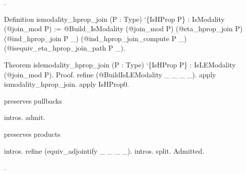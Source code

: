 \begin{coqdoccode}
.\coqdoceol
\coqdocemptyline
\coqdocnoindent
\begin{coqdoccomment}
\coqdoceol
Definition\coqdocindent{0.50em}
ismodality\_hprop\_join\coqdocindent{0.50em}
(P\coqdocindent{0.50em}
:\coqdocindent{0.50em}
Type)\coqdocindent{0.50em}
`\{IsHProp\coqdocindent{0.50em}
P\}\coqdoceol
\coqdocindent{1.00em}
:\coqdocindent{0.50em}
IsModality\coqdocindent{0.50em}
(@join\_mod\coqdocindent{0.50em}
P)\coqdoceol
\coqdocindent{1.00em}
:=\coqdocindent{0.50em}
@Build\_IsModality\coqdocindent{0.50em}
(@join\_mod\coqdocindent{0.50em}
P)\coqdoceol
\coqdocindent{11.50em}
(@eta\_hprop\_join\coqdocindent{0.50em}
P)\coqdoceol
\coqdocindent{11.50em}
(@ind\_hprop\_join\coqdocindent{0.50em}
P\coqdocindent{0.50em}
\_)\coqdoceol
\coqdocindent{11.50em}
(@ind\_hprop\_join\_compute\coqdocindent{0.50em}
P\coqdocindent{0.50em}
\_)\coqdoceol
\coqdocindent{11.50em}
(@isequiv\_eta\_hprop\_join\_path\coqdocindent{0.50em}
P\coqdocindent{0.50em}
\_).\coqdoceol
\coqdoceol
\end{coqdoccomment}
\coqdoceol
\coqdocemptyline
\coqdocnoindent
\begin{coqdoccomment}
\coqdoceol
Theorem\coqdocindent{0.50em}
islemodality\_hprop\_join\coqdocindent{0.50em}
(P\coqdocindent{0.50em}
:\coqdocindent{0.50em}
Type)\coqdocindent{0.50em}
`\{IsHProp\coqdocindent{0.50em}
P\}\coqdocindent{0.50em}
:\coqdoceol
\coqdocindent{1.00em}
IsLEModality\coqdocindent{0.50em}
(@join\_mod\coqdocindent{0.50em}
P).\coqdoceol
Proof.\coqdoceol
\coqdocindent{1.00em}
refine\coqdocindent{0.50em}
(@BuildIsLEModality\coqdocindent{0.50em}
\_\coqdocindent{0.50em}
\_\coqdocindent{0.50em}
\_\coqdocindent{0.50em}
\_).\coqdoceol
\coqdocindent{1.00em}
apply\coqdocindent{0.50em}
ismodality\_hprop\_join.\coqdocindent{0.50em}
apply\coqdocindent{0.50em}
IsHProp0.\coqdoceol
\coqdocindent{1.00em}
\coqdoceol
\coqdocindent{1.00em}
\begin{coqdoccomment}
\coqdocindent{0.50em}
preserves\coqdocindent{0.50em}
pullbacks\coqdocindent{0.50em}
\end{coqdoccomment}
\coqdoceol
\coqdocindent{1.00em}
intros.\coqdoceol
\coqdocindent{1.00em}
admit.\coqdoceol
\coqdocindent{1.00em}
\coqdoceol
\coqdocindent{1.00em}
\begin{coqdoccomment}
\coqdocindent{0.50em}
preserves\coqdocindent{0.50em}
products\coqdocindent{0.50em}
\end{coqdoccomment}
\coqdoceol
\coqdocindent{1.00em}
intros.\coqdoceol
\coqdocindent{1.00em}
refine\coqdocindent{0.50em}
(equiv\_adjointify\coqdocindent{0.50em}
\_\coqdocindent{0.50em}
\_\coqdocindent{0.50em}
\_\coqdocindent{0.50em}
\_).\coqdoceol
\coqdocindent{1.00em}
intros.\coqdocindent{0.50em}
split.\coqdoceol
\coqdocindent{1.00em}
Admitted.\coqdoceol
\end{coqdoccomment}
\coqdoceol
\coqdocemptyline
\coqdocemptyline
\coqdocemptyline
\coqdocemptyline
\coqdocemptyline
\coqdocemptyline
\coqdocnoindent
{} .\coqdoceol
\coqdocemptyline
\end{coqdoccode}
   \begin{coqdoccode}
\end{coqdoccode}
